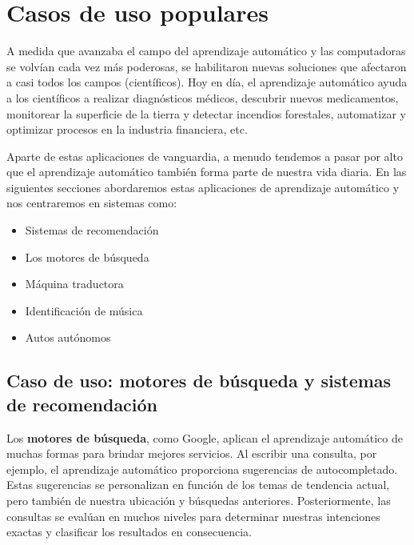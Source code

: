 \documentclass[
]{book}
\providecommand{\tightlist}{%
  \setlength{\itemsep}{0pt}\setlength{\parskip}{0pt}}
\begin{document}
\hypertarget{casos-de-uso-populares}{%
\section{Casos de uso populares}\label{casos-de-uso-populares}}

A medida que avanzaba el campo del aprendizaje automático y las computadoras se volvían cada vez más poderosas, se habilitaron nuevas soluciones que afectaron a casi todos los campos (científicos). Hoy en día, el aprendizaje automático ayuda a los científicos a realizar diagnósticos médicos, descubrir nuevos medicamentos, monitorear la superficie de la tierra y detectar incendios forestales, automatizar y optimizar procesos en la industria financiera, etc.

Aparte de estas aplicaciones de vanguardia, a menudo tendemos a pasar por alto que el aprendizaje automático también forma parte de nuestra vida diaria. En las siguientes secciones abordaremos estas aplicaciones de aprendizaje automático y nos centraremos en sistemas como:

\begin{itemize}
\tightlist
\item
  Sistemas de recomendación
\item
  Los motores de búsqueda
\item
  Máquina traductora
\item
  Identificación de música
\item
  Autos autónomos
\end{itemize}

\hypertarget{caso-de-uso-motores-de-buxfasqueda-y-sistemas-de-recomendaciuxf3n}{%
\subsection{Caso de uso: motores de búsqueda y sistemas de recomendación}\label{caso-de-uso-motores-de-buxfasqueda-y-sistemas-de-recomendaciuxf3n}}

Los \textbf{motores de búsqueda}, como Google, aplican el aprendizaje automático de muchas formas para brindar mejores servicios. Al escribir una consulta, por ejemplo, el aprendizaje automático proporciona sugerencias de autocompletado. Estas sugerencias se personalizan en función de los temas de tendencia actual, pero también de nuestra ubicación y búsquedas anteriores. Posteriormente, las consultas se evalúan en muchos niveles para determinar nuestras intenciones exactas y clasificar los resultados en consecuencia.
\end{document}
